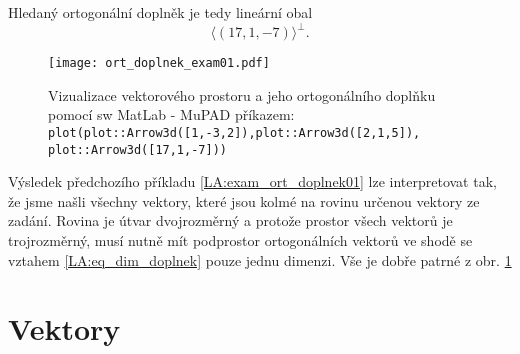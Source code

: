 \begin{example}
          Hledaný ortogonální doplněk je tedy lineární obal $$\langle(17, 1, -7)\rangle^\bot.$$
          \begin{figure}[ht!]
            \centering
            \texttt{[image: ort\_doplnek\_exam01.pdf]}
            \caption[Ortogonální doplněk]{Vizualizace vektorového prostoru a jeho ortogonálního
                     doplňku pomocí sw MatLab - MuPAD příkazem:\newline
                     \texttt{plot(plot::Arrow3d([1,-3,2]),plot::Arrow3d([2,1,5]), 
                     plot::Arrow3d([17,1,-7]))}}
            \label{LA:fig_ort01}
          \end{figure}
      \end{example}
  
      Výsledek předchozího příkladu \ref{LA:exam_ort_doplnek01} lze interpretovat tak, že jsme našli všechny 
      vektory, které jsou kolmé na rovinu určenou vektory ze zadání. Rovina je útvar dvojrozměrný a protože 
      prostor všech vektorů je trojrozměrný, musí nutně mít podprostor ortogonálních vektorů ve shodě se 
      vztahem \ref{LA:eq_dim_doplnek} pouze jednu dimenzi. Vše je dobře patrné z obr. \ref{LA:fig_ort01}
  
    \section{Vektory}
   
  
\printbibliography[title={Seznam literatury}, heading=subbibliography]
